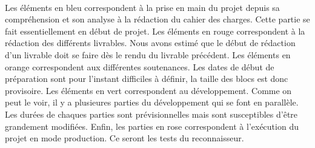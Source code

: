 \paragraph{}
Les éléments en bleu correspondent à la prise en main du projet depuis sa compréhension et son analyse
à la rédaction du cahier des charges. Cette partie se fait essentiellement en début de projet. Les éléments en rouge
correspondent à la rédaction des différents livrables. Nous avons estimé que le début de rédaction d’un livrable
doit se faire dès le rendu du livrable précédent. Les éléments en orange correspondent aux différentes soutenances.
Les dates de début de préparation sont pour l’instant difficiles à définir, la taille des blocs est donc provisoire.
Les éléments en vert correspondent au développement. Comme on peut le voir, il y a plusieures parties du développement
qui se font en parallèle. Les durées de chaques parties sont prévisionnelles mais sont susceptibles d’être grandement modifiées.
Enfin, les parties en rose correspondent à l'exécution du projet en mode production. Ce seront les tests du reconnaisseur.